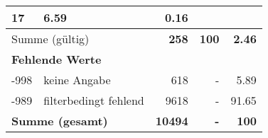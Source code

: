\begin{longtable}{lXrrr}
       \num{17} &
       \num[round-mode=places,round-precision=2]{6.59} &
         \num[round-mode=places,round-precision=2]{0.16} \\
     \midrule
     \multicolumn{2}{l}{Summe (gültig)} &
       \textbf{\num{258}} &
     \textbf{\num{100}} &
       \textbf{\num[round-mode=places,round-precision=2]{2.46}} \\
     \multicolumn{5}{l}{\textbf{Fehlende Werte}}\\
       -998 &
       keine Angabe &
         \num{618} &
        - &
         \num[round-mode=places,round-precision=2]{5.89} \\
       -989 &
       filterbedingt fehlend &
         \num{9618} &
        - &
         \num[round-mode=places,round-precision=2]{91.65} \\
     \midrule
     \multicolumn{2}{l}{\textbf{Summe (gesamt)}} &
          \textbf{\num{10494}} &
        \textbf{-} &
        \textbf{\num{100}} \\
     \bottomrule
     \end{longtable}
     
